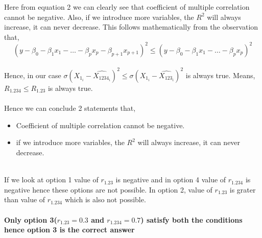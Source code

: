 \documentclass{article}
\begin{document}
Here from equation 2 we can clearly see that coefficient of multiple correlation cannot be negative. Also, if we introduce more variables, the \(R^2\) will always increase, it can never decrease. This follows mathematically from the observation that,\\
\begin{equation}
    (y - \beta_0 - \beta_1x_1 - \dots - \beta_px_p - \beta_{p+1}x_{p+1})^2 \leq (y - \beta_0 - \beta_1x_1 - \dots - \beta_px_p)^2
\end{equation} \\
Hence, in our case \(\sigma(X_{1_i} - \hat{X_{1234_i}})^2 \leq \sigma(X_{1_i} - \hat{X_{123_i}})^2\) is always true. Means, \(R_{1.234} \leq R_{1.23}\) is always true.   
\paragraph{}
Hence we can conclude 2 statements that, \begin{itemize}
    \item Coefficient of multiple correlation cannot be negative.
    \item if we introduce more variables, the \(R^2\) will always increase, it can never decrease.
\end{itemize}
\\
If we look at option 1 value of \(r_{1.23}\) is negative and in option 4 value of  \(r_{1.234}\) is negative hence these options are not possible. In option 2, value of \(r_{1.23}\) is grater than value of \(r_{1.234}\) which is also not possible.
\paragraph{}
\textbf{Only option 3(\(r_{1.23} = 0.3\) and \(r_{1.234} = 0.7\)) satisfy both the conditions hence option 3 is the correct answer}
\end{document}
